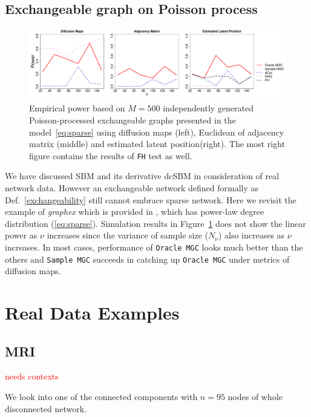\documentclass[12pt]{article}
\theoremstyle{definition}
\begin{document}
\subsection{Exchangeable graph on Poisson process}

\begin{figure}[H]
	\centering
	\includegraphics[width=7in]{../Figure/sparse.pdf}
	\caption{Empirical power based on $M = 500$ independently generated Poisson-processed exchangeable graphs presented in the model~\ref{eq:sparse} using diffusion maps (left), Euclidean of adjacency matrix (middle)  and estimated latent position(right). The most right figure contains the results of \texttt{FH} test as well.}
	\label{fig:sparse}
\end{figure}

We have discussed SBM and its derivative dcSBM in consideration of real network data. However an exchangeable network defined formally as Def.~\ref{exchangeability} still cannot embrace sparse network. Here we revisit the example of \textit{graphex} which is provided in \cite{veitch2015class}, which has power-law degree distribution (\ref{eq:sparse}). Simulation results in Figure~\ref{fig:sparse} does not show the linear power as $\nu$ increases since the variance of sample size ($N_{\nu}$) also increases as $\nu$ increases. In most cases, performance of \texttt{Oracle MGC} looks much better than the others and \texttt{Sample MGC} succeeds in catching up \texttt{Oracle MGC} under metrics of diffusion maps. 

\section{Real Data Examples}
\label{sec:real}
	
\subsection{MRI}
	
\textcolor{red}{needs contexts}	
	
We look into one of the connected components with $n = 95$ nodes of whole disconnected network. 
	
\end{document}
